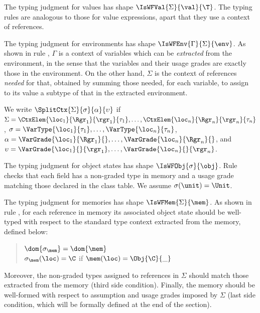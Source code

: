  The typing judgment for values has shape $\IsWFVal{\Sigma}{\val}{\T}$. The typing rules are analogous to those for value expressions, apart that they use a context of references. 
  

The typing judgment for environments has shape $\IsWFEnv{\Gamma}{\Sigma}{\env}$. As shown in rule \mbox{}, $\Gamma$ is a context of variables which can be \emph{extracted} from the environment, in the sense that the variables and their usage grades are exactly those in the environment. On the other hand, $\Sigma$ is the context of references \emph{needed} for that, obtained by summing those needed, for each variable, to assign to its value a subtype of that in the extracted environment.

We write $\SplitCtx{\Sigma}{\sigma}{\alpha}{\upsilon}$ if $\Sigma=\CtxElem{\loc_1}{\Rgr_1}{\rgr_1}{\tau_1}, \ldots, \CtxElem{\loc_n}{\Rgr_n}{\rgr_n}{\tau_n}$, $\sigma=\VarType{\loc_1}{\tau_1}, \ldots, \VarType{\loc_n}{\tau_n}$, $\alpha={\VarGrade{\loc_1}{\Rgr_1}{}, \ldots, \VarGrade{\loc_n}{\Rgr_n}{}}$, and $\upsilon=\VarGrade{\loc_1}{}{\rgr_1}, \ldots, \VarGrade{\loc_n}{}{\rgr_n}$. 

The typing judgment for object states has shape $\IsWFObj{\sigma}{\obj}$. 
Rule  checks that each field has a non-graded type in memory and a usage grade matching those declared in the class table. We assume $\sigma(\unit)=\Unit$.

 The typing judgment for memories has shape $\IsWFMem{\Sigma}{\mem}$.  As shown in rule , for each reference in memory its associated object state should be well-typed with respect to 
 the standard type context extracted from the memory, defined below:
 \begin{quote}
 $\dom{\sigma_\mem}=\dom{\mem}$\\
 $\sigma_\mem(\loc)=\C$ if $\mem(\loc)=\Obj{\C}{\_}$
 \end{quote}
 Moreover, the non-graded types assigned to references in $\Sigma$ should match those extracted from the memory (third side condition). 
 Finally, the memory should be well-formed with respect to assumption and usage grades imposed by $\Sigma$ (last side condition, which will be formally defined at the end of the section).
  

